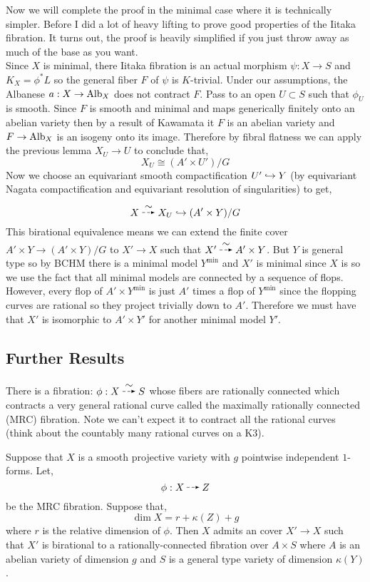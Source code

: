 \documentclass[12pt]{article}
\begin{document}
Now we will complete the proof in the minimal case where it is technically simpler. Before I did a lot of heavy lifting to prove good properties of the Iitaka fibration. It turns out, the proof is heavily simplified if you just throw away as much of the base as you want.
\\
Since $X$ is minimal, there Iitaka fibration is an actual morphism $\psi : X \to S$ and $K_X = \phi^* L$ so the general fiber $F$ of $\psi$ is $K$-trivial. Under our assumptions, the Albanese $a : X \to \mathrm{Alb}_X$ does not contract $F$. Pass to an open $U \subset S$ such that $\phi_U$ is smooth. Since $F$ is smooth and minimal and maps generically finitely onto an abelian variety then by a result of Kawamata it $F$ is an abelian variety and $F \to \mathrm{Alb}_X$ is an isogeny onto its image. Therefore by fibral flatness we can apply the previous lemma $X_U \to U$ to conclude that,
\[ X_U \cong (A' \times U')/G \]
Now we choose an equivariant smooth compactification $U' \hookrightarrow Y$ (by equivariant Nagata compactification and equivariant resolution of singularities) to get,
\[ X \birat X_U \embed (A' \times Y)/G \]
This birational equivalence means we can extend the finite \etale cover $A' \times Y \to (A' \times Y)/G$ to $X' \to X$ such that $X' \birat A' \times Y$. But $Y$ is general type so by BCHM there is a minimal model $Y^{\min}$ and $X'$ is minimal since $X$ is so we use the fact that all minimal models are connected by a sequence of flops. However, every flop of $A' \times Y^{\min}$ is just $A'$ times a flop of $Y^{\min}$ since the flopping curves are rational so they project trivially down to $A'$. Therefore we must have that $X'$ is isomorphic to $A' \times Y'$ for another minimal model $Y'$.

\subsection{Further Results}

There is a fibration: $\phi : X \birat S$ whose fibers are rationally connected which contracts a very general rational curve called the maximally rationally connected (MRC) fibration. Note we can't expect it to contract all the rational curves (think about the countably many rational curves on a K3). 

\begin{theorem}
Suppose that $X$ is a smooth projective variety with $g$ pointwise independent $1$-forms. Let,
\[ \phi : X \rat Z \]
be the MRC fibration. Suppose that,
\[ \dim{X} = r + \kappa(Z) + g \]
where $r$ is the relative dimension of $\phi$. Then $X$ admits an \etale cover $X' \to X$ such that $X'$ is birational to a rationally-connected fibration over $A \times S$ where $A$ is an abelian variety of dimension $g$ and $S$ is a general type variety of dimension $\kappa(Y)$.
\end{theorem}
\end{document}
